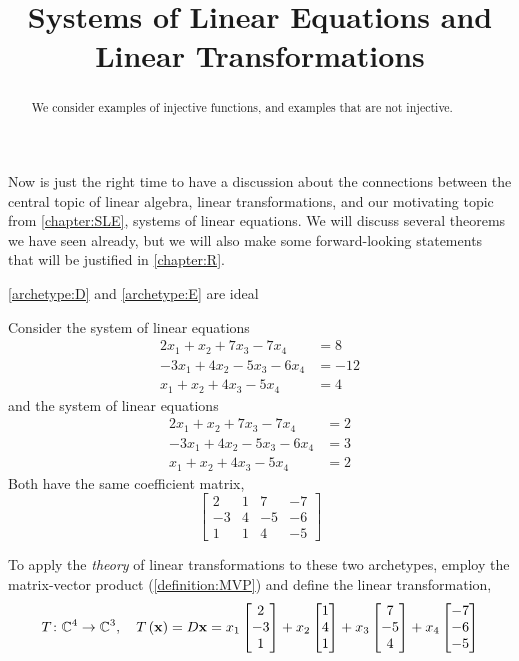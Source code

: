 \documentclass{ximera}
\title{Systems of Linear Equations and Linear Transformations}
\begin{document}
\begin{abstract}
  We consider examples of injective functions, and examples that are not injective.
\end{abstract}
\maketitle

Now is just the right time to have a discussion about the connections between the central topic of linear algebra, linear transformations, and our motivating topic from \ref{chapter:SLE}, systems of linear equations.  We will discuss several theorems we have seen already, but we will also make some forward-looking statements that will be justified in \ref{chapter:R}.

\ref{archetype:D} and \ref{archetype:E} are ideal

Consider the system of linear equations
\begin{align*}
2x_1  + x_2 + 7x_3 - 7x_4 &= 8 \\
-3x_1 + 4x_2 -5x_3 - 6x_4 &=  -12 \\
x_1 +x_2 + 4x_3 - 5x_4 &=  4
\end{align*}
and the system of linear equations
\begin{align*}
2x_1  + x_2 + 7x_3 - 7x_4 &= 2 \\
-3x_1 + 4x_2 -5x_3 - 6x_4 &=  3 \\
x_1 +x_2 + 4x_3 - 5x_4 &=  2
\end{align*}
Both have the same coefficient matrix,
\[
\begin{bmatrix}
2 & 1 & 7 & -7 \\
-3 & 4 &  -5 & -6 \\
1 & 1 & 4 &  -5
\end{bmatrix}
\]

To apply the \textit{theory} of linear transformations to these two archetypes, employ the matrix-vector product (\ref{definition:MVP}) and define the linear transformation,
\[
T\colon \mathbb{C}^{4}\rightarrow\mathbb{C}^{3},\quad T\left(\mathbf{x}\right)=D\mathbf{x}
=x_1\begin{bmatrix}2\\-3\\1\end{bmatrix}+
x_2\begin{bmatrix}1\\4\\1\end{bmatrix}+
x_3\begin{bmatrix}7\\-5\\4\end{bmatrix}+
x_4\begin{bmatrix}-7\\-6\\-5\end{bmatrix}
\]
\end{document}
